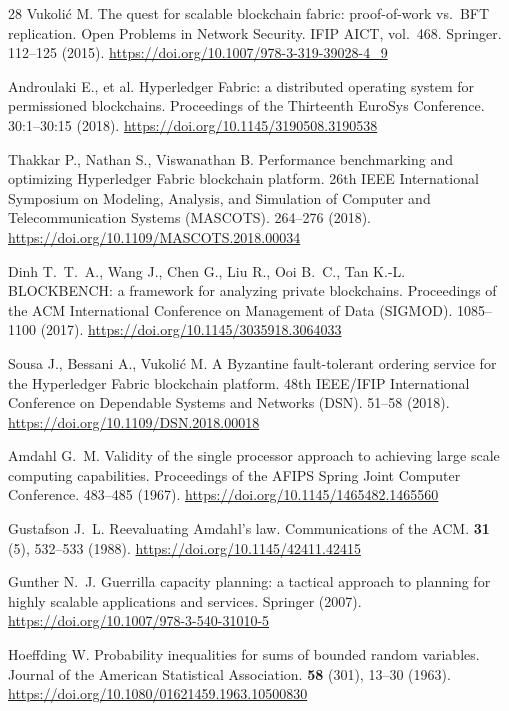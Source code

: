 \begin{thebibliography}{28}
Vukoli\'{c} M. The quest for scalable blockchain fabric: proof-of-work vs.\ BFT
replication. Open Problems in Network Security. IFIP AICT, vol.~468. Springer.
112--125 (2015).
\url{https://doi.org/10.1007/978-3-319-39028-4_9}

Androulaki E., et al. Hyperledger Fabric: a distributed operating system for
permissioned blockchains. Proceedings of the Thirteenth EuroSys Conference.
30:1--30:15 (2018).
\url{https://doi.org/10.1145/3190508.3190538}

Thakkar P., Nathan S., Viswanathan B. Performance benchmarking and optimizing
Hyperledger Fabric blockchain platform. 26th IEEE International Symposium on
Modeling, Analysis, and Simulation of Computer and Telecommunication Systems
(MASCOTS). 264--276 (2018).
\url{https://doi.org/10.1109/MASCOTS.2018.00034}

Dinh T.~T.~A., Wang J., Chen G., Liu R., Ooi B.~C., Tan K.-L. BLOCKBENCH: a
framework for analyzing private blockchains. Proceedings of the ACM
International Conference on Management of Data (SIGMOD). 1085--1100 (2017).
\url{https://doi.org/10.1145/3035918.3064033}

Sousa J., Bessani A., Vukoli\'{c} M. A Byzantine fault-tolerant ordering service
for the Hyperledger Fabric blockchain platform. 48th IEEE/IFIP International
Conference on Dependable Systems and Networks (DSN). 51--58 (2018).
\url{https://doi.org/10.1109/DSN.2018.00018}

Amdahl G.~M. Validity of the single processor approach to achieving large scale
computing capabilities. Proceedings of the AFIPS Spring Joint Computer
Conference. 483--485 (1967).
\url{https://doi.org/10.1145/1465482.1465560}

Gustafson J.~L. Reevaluating Amdahl's law. Communications of the ACM.
\textbf{31} (5), 532--533 (1988).
\url{https://doi.org/10.1145/42411.42415}

Gunther N.~J. Guerrilla capacity planning: a tactical approach to planning for
highly scalable applications and services. Springer (2007).
\url{https://doi.org/10.1007/978-3-540-31010-5}

Hoeffding W. Probability inequalities for sums of bounded random variables.
Journal of the American Statistical Association. \textbf{58} (301), 13--30
(1963).
\url{https://doi.org/10.1080/01621459.1963.10500830}


\end{thebibliography}
